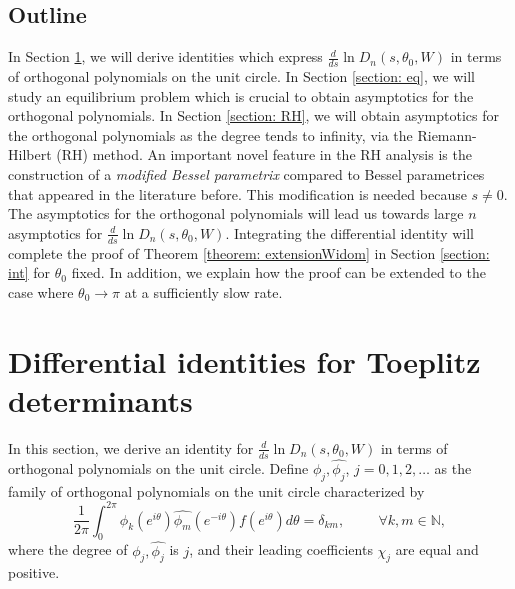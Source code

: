 \documentclass[11pt,fleqn]{article}
\numberwithin{equation}{section}
\begin{document}
\subsection*{Outline}
In Section \ref{section: diff id}, we will derive identities which express $\frac{d}{ds}\ln D_n(s,\theta_0,W)$ in terms of orthogonal polynomials on the unit circle.
In Section \ref{section: eq}, we will study an equilibrium problem which is crucial to obtain asymptotics for the orthogonal polynomials. In Section \ref{section: RH}, we will obtain asymptotics for the orthogonal polynomials as the degree tends to infinity, via the Riemann-Hilbert (RH) method. An important novel feature in the RH analysis is the construction of a {\em modified Bessel parametrix} compared to Bessel parametrices that appeared in the literature before. This modification is needed because $s\neq 0$. The asymptotics for the orthogonal polynomials will lead us towards large $n$ asymptotics for $\frac{d}{ds}\ln D_n(s,\theta_0,W)$. Integrating the differential identity will complete the proof of Theorem \ref{theorem: extensionWidom} 
in Section \ref{section: int} for $\theta_{0}$ fixed. In addition, we explain how the proof can be extended to the case where $\theta_{0} \to \pi$ at a sufficiently slow rate.



\section{Differential identities for Toeplitz determinants}\label{section: diff id}

In this section, we derive an identity for $\frac{d}{ds}\ln D_n(s,\theta_0,W)$ in terms of orthogonal polynomials on the unit circle.
Define $\phi_{j}, \widehat{\phi_j}$, $j=0,1,2,\ldots$ as the family of orthogonal polynomials on the unit circle characterized by
\begin{equation} \label{Orthogonality_condition}
\frac{1}{2\pi} \int_{0}^{2\pi} \phi_{k}(e^{i\theta}) \widehat{\phi_{m}}(e^{-i\theta})f(e^{i\theta})d\theta = \delta_{km}, \hspace{1cm} \forall k,m \in \mathbb{N},
\end{equation}
where the degree of $\phi_{j}, \widehat{\phi_j}$ is $j$, and their leading coefficients $\chi_j$ are equal and positive. 
\end{document}
